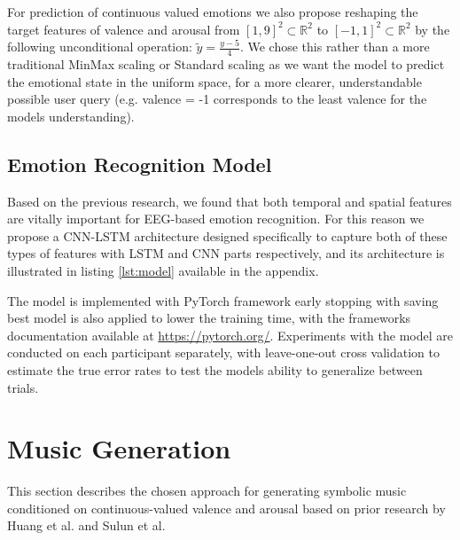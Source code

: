 \documentclass[14pt]{extreport}
\begin{document}
For prediction of continuous valued emotions we also propose reshaping the target features of \gls{valence} and \gls{arousal} from $[1, 9]^2 \subset \mathbb R^2$ to  $[-1, 1]^2 \subset \mathbb R^2$ by the following unconditional operation: $\tilde y = \frac{y - 5}{4}$. We chose this rather than a more traditional MinMax scaling or Standard scaling as we want the model to predict the emotional state in the uniform space, for a more clearer, understandable possible user query (e.g. \gls{valence} = -1 corresponds to the least valence for the models understanding).

\subsection{Emotion Recognition Model}
Based on the previous research, we found that both temporal and spatial features are vitally important for EEG-based emotion recognition. For this reason we propose a CNN-LSTM architecture designed specifically to capture both of these types of features with LSTM and CNN parts respectively, and its architecture is illustrated in listing \ref{lst:model} available in the appendix.

The model is implemented with PyTorch framework \cite{pytorch} early stopping with saving best model is also applied to lower the training time, with the frameworks documentation available at \url{https://pytorch.org/}. Experiments with the model are conducted on each participant separately, with leave-one-out cross validation to estimate the true error rates to test the models ability to generalize between trials. 

\section{Music Generation}
This section describes the chosen approach for generating symbolic music conditioned on continuous-valued \gls{valence} and \gls{arousal} based on prior research by Huang et al. \cite{huang} and Sulun et al. \cite{sulun}
\end{document}
